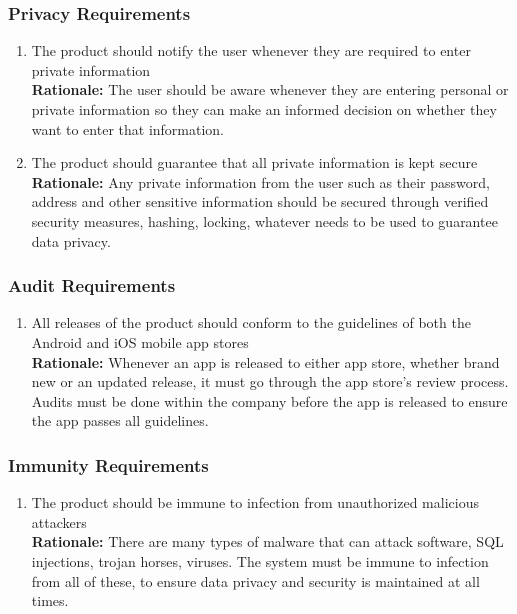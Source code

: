\documentclass[]{article}
\begin{document}
\subsubsection{Privacy Requirements}
\label{ssub:privacy_requirements}
\begin{enumerate}[{SR-P}1. ]
	\item The product should notify the user whenever they are required to enter private information \\
	{\bf Rationale:} The user should be aware whenever they are entering personal or private information so they can make an informed decision on whether they want to enter that information.
	\item The product should guarantee that all private information is kept secure \\
	{\bf Rationale:} Any private information from the user such as their password, address and other sensitive information should be secured through verified security measures, hashing, locking, whatever needs to be used to guarantee data privacy.
\end{enumerate}

\subsubsection{Audit Requirements}
\label{ssub:audit_requirements}
\begin{enumerate}[{SR-AU}1. ]
	\item All releases of the product should conform to the guidelines of both the Android and iOS mobile app stores \\
	{\bf Rationale:} Whenever an app is released to either app store, whether brand new or an updated release, it must go through the app store's review process. Audits must be done within the company before the app is released to ensure the app passes all guidelines.
\end{enumerate}

\subsubsection{Immunity Requirements}
\label{ssub:immunity_requirements}
\begin{enumerate}[{SR-IM}1. ]
	\item The product should be immune to infection from unauthorized malicious attackers \\
	{\bf Rationale:} There are many types of malware that can attack software, SQL injections, trojan horses, viruses. The system must be immune to infection from all of these, to ensure data privacy and security is maintained at all times.
\end{enumerate}
\end{document}
